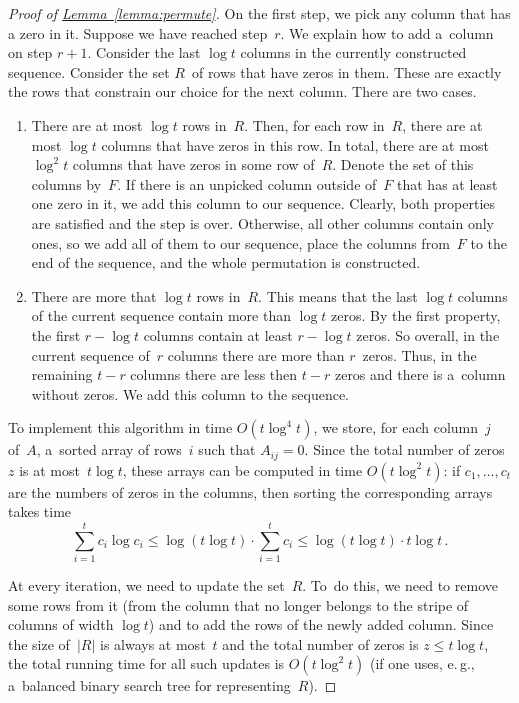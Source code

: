 \documentclass[11pt]{article}
\numberwithin{equation}{section}
\theoremstyle{definition}
\theoremstyle{plain}
\newcommand{\eg}{e.\,g.}
\newcommand{\expref}[2]{\hyperref[#2]{#1~\ref{#2}}}
\theoremstyle{plain}\newtheorem{observation}[theorem]{Observation}
\begin{document}
\begin{proof}[Proof of {\expref{Lemma}{lemma:permute}}]
    On the first step, we pick any column that has a zero in it. Suppose
    we have reached step~$r$. We explain how to add a~column on
    step $r+1$. Consider the last $\log t$ columns in the currently
    constructed sequence. Consider the set $R$~of rows that have
    zeros in them. These are exactly the rows that constrain our
    choice for the next column. There are two cases.
    \begin{enumerate}
        \item There are at most $\log t$ rows in~$R$. Then, for each row in~$R$, there
        are at most $\log t$ columns that have zeros in this row. In total, there are at
        most $\log^2 t$ columns that have zeros in some row of~$R$. Denote the set of
        this columns by~$F$. If there is an unpicked column outside of~$F$ that has at
        least one zero in it, we add this column to our sequence. Clearly, both
        properties are satisfied and the step is over. Otherwise, all other columns
        contain only ones, so we add all of them to our sequence, place the columns
        from~$F$ to the end of the sequence, and the whole permutation is constructed.
        \item There are more that $\log t$ rows in~$R$. This means that the last
        $\log t$ columns of the current sequence contain more than $\log t$ zeros. By
        the first property, the first $r - \log t$ columns contain at least $r - \log t$
        zeros. So overall, in the current sequence of~$r$ columns there are more than
        $r$~zeros. Thus, in the remaining $t-r$ columns there are less then $t-r$ zeros
        and there is a~column without zeros. We add this column to the sequence.
    \end{enumerate}


    To implement this algorithm in time $O(t\log^{4}t)$, we store, for each
    column~$j$ of~$A$, a~sorted array of rows~$i$ such that $A_{ij}=0$. Since the
    total number of zeros~$z$ is at most~$t\log t$, these arrays can be computed in
    time $O(t\log^2t)$: if $c_1, \dotsc, c_t$ are the numbers of zeros in the
    columns, then sorting the corresponding arrays takes time
    \[\sum_{i=1}^{t}c_i \log c_i \le \log(t \log t) \cdot \sum_{i=1}^{t}c_i \le \log(t \log t) \cdot t\log t \, .\]

    At every iteration, we need to update the set~$R$. To~do this, we need to remove
    some rows from it (from the column that no longer belongs to the stripe of
    columns of width $\log t$) and to add the rows of the newly added column. Since
    the size of~$|R|$ is always at most~$t$ and the total number of zeros is
    $z \le t\log t$, the total running time for all such updates is
    $O(t\log^2t)$ (if one uses, \eg, a~balanced binary search tree for
    representing~$R$).


\end{proof}
\end{document}
